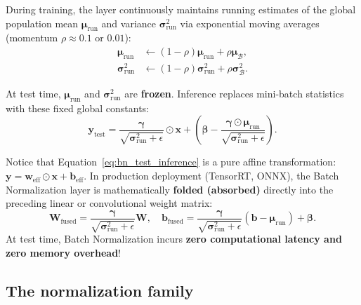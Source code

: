 During training, the layer continuously maintains running estimates of the global population mean $\boldsymbol{\mu}_{\text{run}}$ and variance $\boldsymbol{\sigma}_{\text{run}}^2$ via exponential moving averages (momentum $\rho \approx 0.1$ or $0.01$):
\begin{align}
\boldsymbol{\mu}_{\text{run}} &\leftarrow (1 - \rho) \boldsymbol{\mu}_{\text{run}} + \rho \boldsymbol{\mu}_{\mathcal{B}}, \label{eq:running_mean} \\
\boldsymbol{\sigma}^2_{\text{run}} &\leftarrow (1 - \rho) \boldsymbol{\sigma}^2_{\text{run}} + \rho \boldsymbol{\sigma}^2_{\mathcal{B}}. \label{eq:running_var}
\end{align}

At test time, $\boldsymbol{\mu}_{\text{run}}$ and $\boldsymbol{\sigma}_{\text{run}}^2$ are \textbf{frozen}. Inference replaces mini-batch statistics with these fixed global constants:
\begin{equation}
\mathbf{y}_{\text{test}} = \frac{\boldsymbol{\gamma}}{\sqrt{\boldsymbol{\sigma}^2_{\text{run}} + \epsilon}} \odot \mathbf{x} + \left( \boldsymbol{\beta} - \frac{\boldsymbol{\gamma} \odot \boldsymbol{\mu}_{\text{run}}}{\sqrt{\boldsymbol{\sigma}^2_{\text{run}} + \epsilon}} \right).
\label{eq:bn_test_inference}
\end{equation}

Notice that Equation~\eqref{eq:bn_test_inference} is a pure affine transformation: $\mathbf{y} = \mathbf{w}_{\text{eff}} \odot \mathbf{x} + \mathbf{b}_{\text{eff}}$. In production deployment (TensorRT, ONNX), the Batch Normalization layer is mathematically \textbf{folded (absorbed)} directly into the preceding linear or convolutional weight matrix:
\begin{equation}
\mathbf{W}_{\text{fused}} = \frac{\boldsymbol{\gamma}}{\sqrt{\boldsymbol{\sigma}_{\text{run}}^2 + \epsilon}} \mathbf{W}, \quad \mathbf{b}_{\text{fused}} = \frac{\boldsymbol{\gamma}}{\sqrt{\boldsymbol{\sigma}_{\text{run}}^2 + \epsilon}} (\mathbf{b} - \boldsymbol{\mu}_{\text{run}}) + \boldsymbol{\beta}.
\end{equation}
At test time, Batch Normalization incurs \textbf{zero computational latency and zero memory overhead}!

\subsection{The normalization family}
\label{sec:spatial_batch_norm}
\label{sec:normalization_taxonomy}

